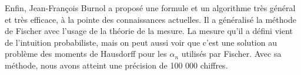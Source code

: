 Enfin, Jean-François Burnol \cite{burnol} a proposé une formule et un algorithme
très général et très efficace, à la pointe des connaissances actuelles. Il a
généralisé la méthode de Fischer avec l’usage de la théorie de la mesure. La
mesure qu’il a défini vient de l’intuition probabiliste, mais on peut aussi voir
que c’est une solution au problème des moments de Hausdorff pour les
$\alpha_{n}$ utilisés par Fischer. Avec sa méthode, nous avons atteint une
précision de 100 000 chiffres. 



